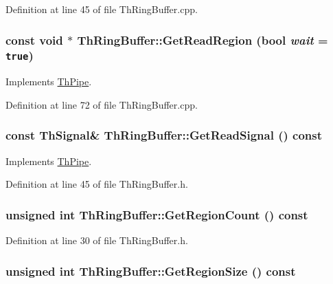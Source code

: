Definition at line 45 of file ThRingBuffer.cpp.\hypertarget{class_th_ring_buffer_9a183e067d41605a1c376a84f4dbf4b2}{
\subsubsection[{GetReadRegion}]{\setlength{\rightskip}{0pt plus 5cm}const void $\ast$ ThRingBuffer::GetReadRegion (bool {\em wait} = {\tt true})}}
\label{class_th_ring_buffer_9a183e067d41605a1c376a84f4dbf4b2}




Implements \hyperlink{class_th_pipe_543d5b9358cb2c06517f78d8a6d8ad17}{ThPipe}.

Definition at line 72 of file ThRingBuffer.cpp.\hypertarget{class_th_ring_buffer_97f956255ad5d7b0dad71096e7c79423}{
\subsubsection[{GetReadSignal}]{\setlength{\rightskip}{0pt plus 5cm}const {\bf ThSignal}\& ThRingBuffer::GetReadSignal () const}}
\label{class_th_ring_buffer_97f956255ad5d7b0dad71096e7c79423}




Implements \hyperlink{class_th_pipe_32dfa60adbe180b619ee5f99826ef39b}{ThPipe}.

Definition at line 45 of file ThRingBuffer.h.\hypertarget{class_th_ring_buffer_9cb0a2b4b02c3c02fdb0f30386e80ef4}{
\subsubsection[{GetRegionCount}]{\setlength{\rightskip}{0pt plus 5cm}unsigned int ThRingBuffer::GetRegionCount () const}}
\label{class_th_ring_buffer_9cb0a2b4b02c3c02fdb0f30386e80ef4}




Definition at line 30 of file ThRingBuffer.h.\hypertarget{class_th_ring_buffer_15dac6f34adbef384a16fa2f184eb372}{
\subsubsection[{GetRegionSize}]{\setlength{\rightskip}{0pt plus 5cm}unsigned int ThRingBuffer::GetRegionSize () const}}
\label{class_th_ring_buffer_15dac6f34adbef384a16fa2f184eb372}




